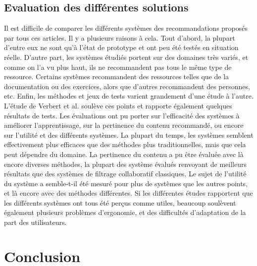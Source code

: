 \documentclass[conference]{./sty/IEEEtran}
\begin{document}
\subsection{Evaluation des différentes solutions}
Il est difficile de comparer les différents systèmes des recommandations proposés par tous ces articles. Il y a plusieurs raisons à cela. Tout d'abord, la plupart d'entre eux ne sont qu'à l'état de prototype et ont peu été testés en situation réelle. D'autre part, les systèmes étudiés portent sur des domaines très variés, et comme on l'a vu plus haut, ils ne recommandent pas tous le même type de ressource. Certains systèmes recommandent des ressources telles que de la documentation ou des exercices, alors que d'autres recommandent des personnes, etc. Enfin, les méthodes et jeux de tests varient grandement d'une étude à l'autre.\\

L'étude de Verbert et al. \cite{DBLP:journals/tlt/VerbertMOWDBD12} soulève ces points et rapporte également quelques résultats de tests. Les évaluations ont pu porter sur l'efficacité des systèmes à améliorer l'apprentissage, sur la pertinence du contenu recommandé, ou encore sur l'utilité et des différents systèmes. La plupart du temps, les systèmes semblent effectivement plus efficaces que des méthodes plus traditionnelles, mais que cela peut dépendre du domaine. La pertinence du contenu a pu être évaluée avec là encore diverses méthodes, la plupart des système évalués renvoyant de meilleurs résultats que des systèmes de filtrage collaboratif classiques. Le sujet de l'utilité du système a semble-t-il été mesuré pour plus de systèmes que les autres points, et là encore avec des méthodes différentes. Si les différentes études rapportent que les différents systèmes ont tous été perçus comme utiles, beaucoup soulèvent également plusieurs problèmes d'ergonomie, et des difficultés d'adaptation de la part des utilisateurs.\\




\section{Conclusion}




\end{document}
